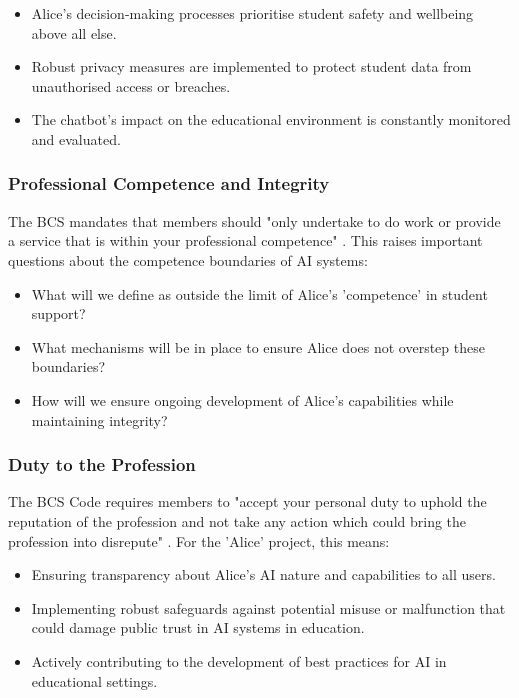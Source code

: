 \documentclass[15pt,a4paper]{article}
\begin{document}
\begin{multicols}{2}
\begin{itemize}
    \item Alice's decision-making processes prioritise student safety and wellbeing above all else.
    \item Robust privacy measures are implemented to protect student data from unauthorised access or breaches.
    \item The chatbot's impact on the educational environment is constantly monitored and evaluated.
\end{itemize}

\subsubsection*{Professional Competence and Integrity}
The BCS mandates that members should "only undertake to do work or provide a service that is within your professional competence" \textit{\parencite[p. 2]{BCS2024}}. This raises important questions about the competence boundaries of AI systems:

\begin{itemize}
    \item What will we define as outside the limit of Alice's 'competence' in student support?
    \item What mechanisms will be in place to ensure Alice does not overstep these boundaries?
    \item How will we ensure ongoing development of Alice's capabilities while maintaining integrity?
\end{itemize}

\subsubsection*{Duty to the Profession}
The BCS Code requires members to "accept your personal duty to uphold the reputation of the profession and not take any action which could bring the profession into disrepute" \textit{\parencite[p. 3]{BCS2024}}. For the 'Alice' project, this means:

\begin{itemize}
    \item Ensuring transparency about Alice's AI nature and capabilities to all users.
    \item Implementing robust safeguards against potential misuse or malfunction that could damage public trust in AI systems in education.
    \item Actively contributing to the development of best practices for AI in educational settings.
\end{itemize}


\end{multicols}
\end{document}

